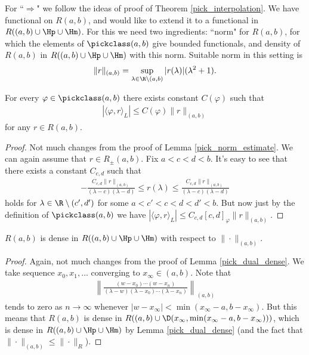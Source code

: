 For ``$\Rightarrow$" we follow the ideas of proof of Theorem \ref{pick_interpolation}. We have functional on $R(a, b)$, and would like to extend it to a functional in $R((a, b) \cup \Hp \cup \Hm)$. For this we need two ingredients: ``norm" for $R(a, b)$, for which the elements of $\pickclass(a, b)$ give bounded functionals, and density of $R(a, b)$ in $R((a, b) \cup \Hp \cup \Hm)$ with this norm. Suitable norm in this setting is
\begin{align*}
	\|r\|_{(a, b)} = \sup_{\lambda \in \R \setminus (a, b)} |r(\lambda)| (\lambda^{2} + 1).
\end{align*}
\begin{lem}\label{pick_norm_estimate_2}
	For every $\varphi \in \pickclass(a, b)$ there exists constant $C(\varphi)$ such that
	\begin{align*}
		\left|\langle \varphi, r\rangle_{L}\right| \leq C(\varphi) \|r\|_{(a, b)}
	\end{align*}
	for any $r \in R(a, b)$.
\end{lem}
\begin{proof}
	Not much changes from the proof of Lemma \ref{pick_norm_estimate}. We can again assume that $r \in R_{\pm}(a, b)$. Fix $a < c < d < b$. It's easy to see that there exists a constant $C_{c, d}$ such that
	\begin{align*}
		-\frac{C_{c, d}\|r\|_{(a, b)}}{(\lambda - c) (\lambda - d)} \leq r(\lambda) \leq \frac{C_{c, d}\|r\|_{(a, b)}}{(\lambda - c) (\lambda - d)}
	\end{align*}
	holds for $\lambda \in \R \setminus (c', d')$ for some $a < c' < c < d < d' < b$. But now just by the definition of $\pickclass(a, b)$ we have $|\langle \varphi, r\rangle_{L}| \leq C_{c, d} [c, d]_{\varphi} \|r\|_{(a, b)}$.
\end{proof}

\begin{lem}\label{pick_dual_dense_2}
	$R(a, b)$ is dense in $R((a, b) \cup \Hp \cup \Hm)$ with respect to $\|\cdot\|_{(a, b)}$.
\end{lem}
\begin{proof}
	Again, not much changes from the proof of Lemma \ref{pick_dual_dense}. We take sequence $x_{0}, x_{1}, \ldots $ converging to $x_{\infty} \in (a, b)$. Note that
	\begin{align*}
		\left\|\frac{(w - x_{0}) \cdots (w - x_{n})}{(\lambda - w)(\lambda - x_{0}) \cdots (\lambda - x_{n})}\right\|_{(a, b)}
	\end{align*}
	tends to zero as $n \to \infty$ whenever $|w - x_{\infty}| < \min(x_{\infty} - a, b - x_{\infty})$. But this means that $R(a, b)$ is dense in $R((a, b) \cup \D(x_{\infty}, \min(x_{\infty} - a, b - x_{\infty})))$, which is dense in $R((a, b) \cup \Hp \cup \Hm)$ by Lemma \ref{pick_dual_dense} (and the fact that $\|\cdot\|_{(a, b)} \leq \|\cdot\|_{R}$).
\end{proof}

